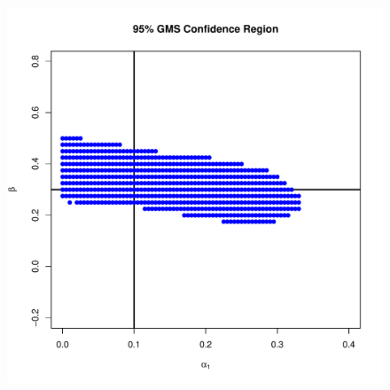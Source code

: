 \documentclass{beamer}
\begin{document}
\begin{frame}
  \begin{figure}
    \centering
    \includegraphics[scale=0.5]{GMS.pdf}
  \end{figure}
\end{frame}
\end{document}
